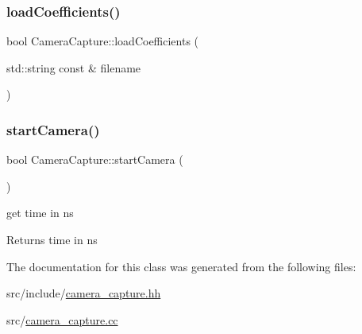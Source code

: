 \subsubsection{\texorpdfstring{loadCoefficients()}{loadCoefficients()}}
{\footnotesize\ttfamily bool Camera\+Capture\+::load\+Coefficients (\begin{DoxyParamCaption}\item[{std\+::string const \&}]{filename }\end{DoxyParamCaption})}

\mbox{\label{class_camera_capture_a8b11e21f8886811195f691ca54ec7c80}} 
\subsubsection{\texorpdfstring{startCamera()}{startCamera()}}
{\footnotesize\ttfamily bool Camera\+Capture\+::start\+Camera (\begin{DoxyParamCaption}{ }\end{DoxyParamCaption})}

get time in ns \begin{DoxyReturn}{Returns}
time in ns 
\end{DoxyReturn}


The documentation for this class was generated from the following files\+:\begin{DoxyCompactItemize}
\item 
src/include/\mbox{\hyperlink{camera__capture_8hh}{camera\+\_\+capture.\+hh}}\item 
src/\mbox{\hyperlink{camera__capture_8cc}{camera\+\_\+capture.\+cc}}\end{DoxyCompactItemize}
